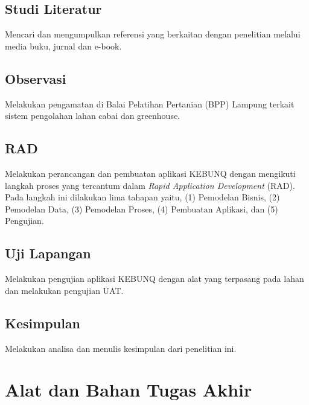 \begin{flushleft}
\begin{justify}
         \subsection{Studi Literatur}
         Mencari dan mengumpulkan referensi yang berkaitan dengan penelitian melalui media buku, jurnal dan e-book.\\
      
         \subsection{Observasi}
         Melakukan pengamatan di Balai Pelatihan Pertanian (BPP) Lampung terkait sistem pengolahan lahan cabai dan greenhouse.\\
         \subsection{RAD}
         Melakukan perancangan dan pembuatan aplikasi KEBUNQ dengan mengikuti langkah proses yang tercantum dalam \textit{Rapid Application Development} (RAD). Pada langkah ini dilakukan lima tahapan yaitu, (1) Pemodelan Bisnis, (2) Pemodelan Data, (3) Pemodelan Proses, (4) Pembuatan Aplikasi, dan (5) Pengujian.\\
         \subsection{Uji Lapangan}
         Melakukan pengujian aplikasi KEBUNQ dengan alat yang terpasang pada lahan dan melakukan pengujian UAT.\\
         \subsection{Kesimpulan}
         Melakukan analisa dan menulis kesimpulan dari penelitian ini.\\

       \section{Alat dan Bahan Tugas Akhir}

\end{justify}
\end{flushleft}
